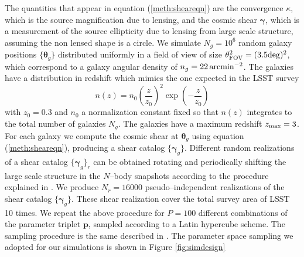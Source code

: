 \documentclass[reprint,aps,prd,superscriptaddress,showkeys,showpacs]{revtex4-1}
\newcommand{\bb}[1]{\mathbf{#1}}
\begin{document}
%
The quantities that appear in equation (\ref{meth:sheareqn}) are the convergence $\kappa$, which is the source magnification due to lensing, and the cosmic shear $\pmb{\gamma}$, which is a measurement of the source ellipticity due to lensing from large scale structure, assuming the non lensed shape is a circle. 
We simulate $N_g = 10^6$ random galaxy positions $\{\pmb{\theta}_g\}$ distributed uniformly in a field of view of size $\theta_{\rm FOV}^2=(3.5{\rm deg})^2$, which correspond to a galaxy angular density of $n_g=22\,\rm{arcmin}^{-2}$. The galaxies have a distribution in redshift which mimics the one expected in the LSST survey
\begin{equation}
\label{meth:galdistr}
n(z) = n_0\left(\frac{z}{z_0}\right)^2\exp\left(-\frac{z}{z_0}\right)
\end{equation}  
%
with $z_0=0.3$ and $n_0$ a normalization constant fixed so that $n(z)$ integrates to the total number of galaxies $N_g$. The galaxies have a maximum redshift $z_{\rm max}=3$. For each galaxy we compute the cosmic shear at $\pmb{\theta}_g$ using equation (\ref{meth:sheareqn}), producing a shear catalog $\{\pmb{\gamma}_g\}$. Different random realizations of a shear catalog $\{\pmb{\gamma}_g\}_r$ can be obtained rotating and periodically shifting the large scale structure in the $N$--body snapshots according to the procedure explained in \citep{PetriVariance}. We produce $N_r=16000$ pseudo--independent realizations of the shear catalog $\{\pmb{\gamma}_g\}$. These shear realization cover the total survey area of LSST 10 times.
We repeat the above procedure for $P=100$ different combinations of the parameter triplet $\bb{p}$, sampled according to a Latin hypercube scheme. The sampling procedure is the same described in \citep{CFHTMink,CFHTPeaks}. The parameter space sampling we adopted for our simulations is shown in Figure \ref{fig:simdesign}
\end{document}
